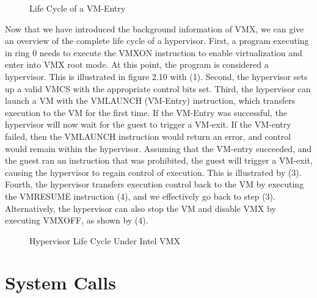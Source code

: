 \documentclass{report}
\begin{document}
\begin{spacing}{1.5}
{}
\begin{figure}[ht]
\hspace*{-3cm}
\centering
  \caption{Life Cycle of a VM-Entry}
\end{figure}


{\large
\noindent Now that we have introduced the background information of VMX, we can give an overview of the complete life cycle of a hypervisor. First, a program executing in ring 0 needs to execute the VMXON instruction to enable virtualization and enter into VMX root mode. At this point, the program is considered a hypervisor. This is illustrated in figure 2.10 with (1). Second, the hypervisor sets up a valid VMCS with the appropriate control bits set. Third, the hypervisor can launch a VM with the VMLAUNCH (VM-Entry) instruction, which transfers execution to the VM for the first time. If the VM-Entry was successful, the hypervisor will now wait for the guest to trigger a VM-exit. If the VM-entry failed, then the VMLAUNCH instruction would return an error, and control would remain within the hypervisor. Assuming that the VM-entry succeeded, and the guest ran an instruction that was prohibited, the guest will trigger a VM-exit, causing the hypervisor to regain control of execution. This is illustrated by (3). Fourth, the hypervisor transfers execution control back to the VM by executing the VMRESUME instruction (4), and we effectively go back to step (3). Alternatively, the hypervisor can also stop the VM and disable VMX by executing VMXOFF, as shown by (4).
\newline


{}
\begin{figure}[ht]
\centering
  \caption{Hypervisor Life Cycle Under Intel VMX}
\end{figure}
}





\section{System Calls}


\end{spacing}
\end{document}
